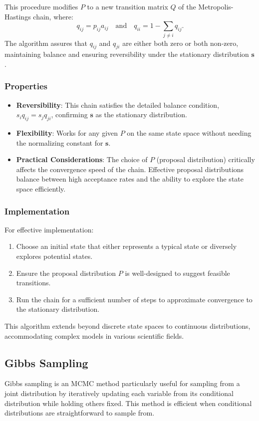 \documentclass{article}
\begin{document}
This procedure modifies $P$ to a new transition matrix $Q$ of the Metropolis-Hastings chain, where:
\[
q_{ij} = p_{ij} a_{ij} \quad \text{and} \quad q_{ii} = 1 - \sum_{j \neq i} q_{ij}.
\]
The algorithm assures that $q_{ij}$ and $q_{ji}$ are either both zero or both non-zero, maintaining balance and ensuring reversibility under the stationary distribution $\mathbf{s}$.

\subsubsection{Properties}
\begin{itemize}
    \item \textbf{Reversibility}: This chain satisfies the detailed balance condition, $s_i q_{ij} = s_j q_{ji}$, confirming $\mathbf{s}$ as the stationary distribution.
    \item \textbf{Flexibility}: Works for any given $P$ on the same state space without needing the normalizing constant for $\mathbf{s}$.
    \item \textbf{Practical Considerations}: The choice of $P$ (proposal distribution) critically affects the convergence speed of the chain. Effective proposal distributions balance between high acceptance rates and the ability to explore the state space efficiently.
\end{itemize}

\subsubsection{Implementation}
For effective implementation:
\begin{enumerate}
    \item Choose an initial state that either represents a typical state or diversely explores potential states.
    \item Ensure the proposal distribution $P$ is well-designed to suggest feasible transitions.
    \item Run the chain for a sufficient number of steps to approximate convergence to the stationary distribution.
\end{enumerate}

This algorithm extends beyond discrete state spaces to continuous distributions, accommodating complex models in various scientific fields.

\subsection{Gibbs Sampling}
Gibbs sampling is an MCMC method particularly useful for sampling from a joint distribution by iteratively updating each variable from its conditional distribution while holding others fixed. This method is efficient when conditional distributions are straightforward to sample from.
\end{document}
